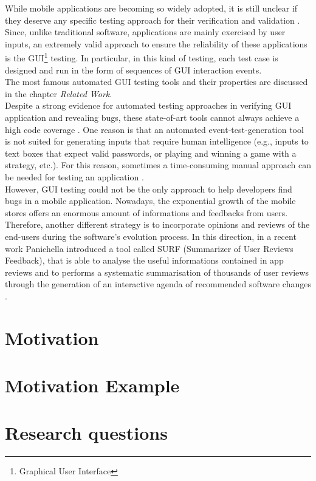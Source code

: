 While mobile applications are becoming so widely adopted, it is still unclear if they deserve any specific testing approach for their verification and validation \cite{Amalfitano2013}.\\
Since, unlike traditional software, applications are mainly exercised by user inputs, an extremely valid approach to ensure the reliability of these applications is the GUI\footnote{Graphical User Interface} testing. In particular, in this kind of testing, each test case is designed and run in the form of sequences of GUI interaction events. \\
The most famous automated GUI testing tools and their properties are discussed in the chapter \textit{Related Work}. \\
Despite a strong evidence for automated testing approaches in verifying GUI application and revealing bugs, these state-of-art tools cannot always achieve a high code coverage \cite{Nagappan2015}. One reason is that an automated event-test-generation tool is not suited for generating inputs that require human intelligence (e.g., inputs to text boxes that expect valid passwords, or playing and winning a game with a strategy, etc.).
For this reason, sometimes a time-consuming manual approach can be needed for testing an application \cite{Nagappan2015}. \\
However, GUI testing could not be the only approach to help developers find bugs in a mobile application. Nowadays, the exponential growth of the mobile stores offers an enormous amount of informations and feedbacks from users. Therefore, another different strategy is to incorporate opinions and reviews of the end-users during the software's evolution process. \newline
In this direction, in a recent work Panichella \etal introduced a tool called SURF (Summarizer of User Reviews Feedback), that is able to analyse the useful informations contained in app reviews and to performs a systematic summarisation of thousands of user reviews through the generation of an interactive agenda of recommended software changes \cite{DBLP:conf/sigsoft/SorboPASVCG16}.

\section{Motivation}
\section{Motivation Example}
\section{Research questions}